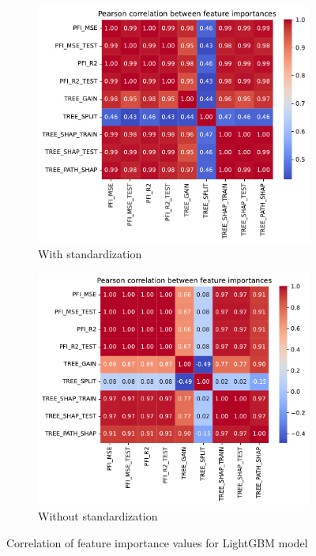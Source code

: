 \begin{figure}[t]
    \centering
    \begin{subfigure}[t]{0.45\textwidth}
        \centering
        \includegraphics[width=\textwidth]{chapters/04_feature_importance_estimation/img/standardization/lin/lgbm_scaled/feature_importance_correlation}
        \caption{ With standardization}
        \label{fig:lgbm_scaled_correlation}
    \end{subfigure}
    \hfill
    \begin{subfigure}[t]{0.45\textwidth}
        \centering
        \includegraphics[width=\textwidth]{chapters/04_feature_importance_estimation/img/standardization/lin/lgbm_nonscaled/feature_importance_correlation}
        \caption{Without standardization}
        \label{fig:lgbm_nonscaled_correlation}
    \end{subfigure}
    \caption{Correlation of feature importance values for LightGBM model}
    \label{fig:lgbm_correlation}
\end{figure}






